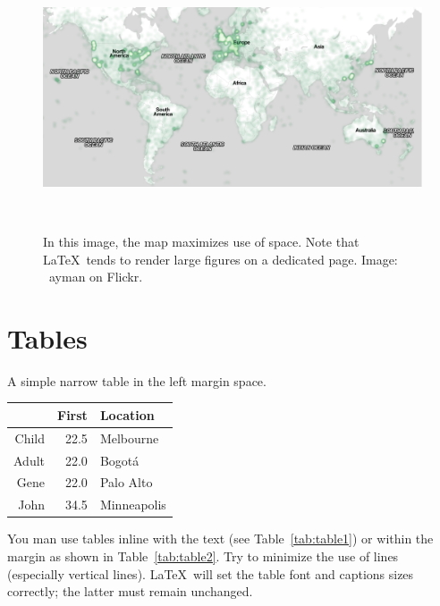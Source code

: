 \documentclass[sigchi-a, authorversion]{acmart}
\begin{document}
\begin{figure}
  \includegraphics[width=\fulltextwidth]{map}
  \caption{In this image, the map maximizes use of space.
    Note that \LaTeX\ tends to render large figures on a
    dedicated page. Image: \ccbynd~ayman on Flickr.}~\label{fig:cats}
\end{figure}


\section{Tables}


\begin{margintable}
    \caption{A simple narrow table in the left margin
      space.}
    \label{tab:table2}
    \begin{tabular}{r r l}
      & {\small \textbf{First}}
      & {\small \textbf{Location}} \\
      \toprule
      Child & 22.5 & Melbourne \\
      Adult & 22.0 & Bogot\'a \\
      \midrule
      Gene & 22.0 & Palo Alto \\
      John & 34.5 & Minneapolis \\
      \bottomrule
    \end{tabular}
\end{margintable}

You man use tables inline with the text (see Table~\ref{tab:table1})
or within the margin as shown in Table~\ref{tab:table2}. Try to
minimize the use of lines (especially vertical lines). \LaTeX\ will
set the table font and captions sizes correctly; the latter must
remain unchanged.
\end{document}
